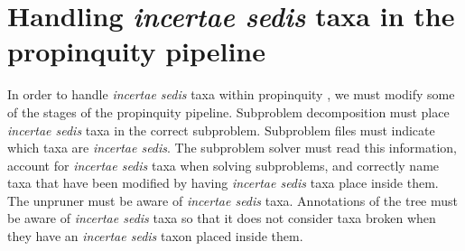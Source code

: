 \documentclass[english]{article}
\begin{document}
\section{Handling \emph{incertae sedis} taxa in the propinquity
pipeline}

In order to handle \emph{incertae sedis} taxa within propinquity \citep{redelings2017supertree}, we
must modify some of the stages of the propinquity pipeline.
Subproblem
decomposition must place \emph{incertae sedis} taxa in the correct
subproblem.
Subproblem files must indicate which taxa are \emph{incertae sedis}.
The subproblem solver must read this information, account for
\emph{incertae sedis} taxa when solving subproblems, and correctly
name taxa that have been modified by having \emph{incertae sedis} taxa
place inside them.
The unpruner must be aware of \emph{incertae sedis}
taxa.
Annotations of the tree must be aware of \emph{incertae sedis}
taxa so that it does not consider taxa broken when they have an
\emph{incertae sedis} taxon placed inside them.



\end{document}

